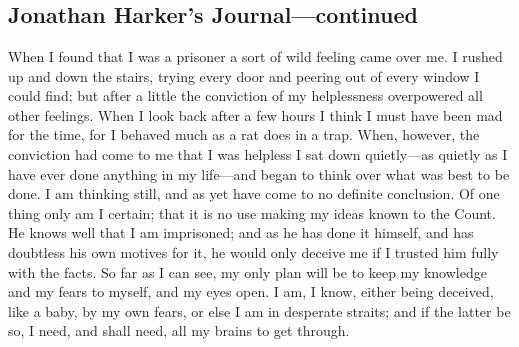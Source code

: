 \chapter[Chapter \thechapter]{}

\section{Jonathan Harker's Journal—continued}
	
When I found that I was a prisoner a sort of wild feeling came over me. I rushed up and down the stairs, trying every door and peering out of every window I could find; but after a little the conviction of my helplessness overpowered all other feelings. When I look back after a few hours I think I must have been mad for the time, for I behaved much as a rat does in a trap. When, however, the conviction had come to me that I was helpless I sat down quietly—as quietly as I have ever done anything in my life—and began to think over what was best to be done. I am thinking still, and as yet have come to no definite conclusion. Of one thing only am I certain; that it is no use making my ideas known to the Count. He knows well that I am imprisoned; and as he has done it himself, and has doubtless his own motives for it, he would only deceive me if I trusted him fully with the facts. So far as I can see, my only plan will be to keep my knowledge and my fears to myself, and my eyes open. I am, I know, either being deceived, like a baby, by my own fears, or else I am in desperate straits; and if the latter be so, I need, and shall need, all my brains to get through.

